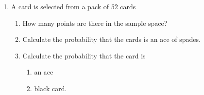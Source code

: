 \begin{enumerate}[label=\thechapter.\arabic*,ref=\thechapter.\theenumi]

\item A card is selected from a pack of 52 cards\\
\begin{enumerate}
\item How many points are there in the sample space?
\item Calculate the probability that the cards is an ace of spades.
\item Calculate the probability that the card is \begin{enumerate} \item an ace \item black card.
\end{enumerate}
\end{enumerate}
\end{enumerate}

